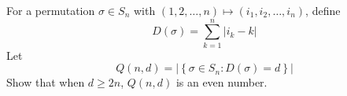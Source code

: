 For a permutation \( \sigma\in S_n\) with \( (1,2,\dots,n)\mapsto(i_1,i_2,\dots,i_n)\), define
\[ D(\sigma) = \sum_{k = 1}^n |i_k - k|
\]
Let
\[ Q(n,d) = \left|\left\{\sigma\in S_n : D(\sigma) = d\right\}\right|
\]
Show that when \( d \geq 2n\), \( Q(n,d)\) is an even number.